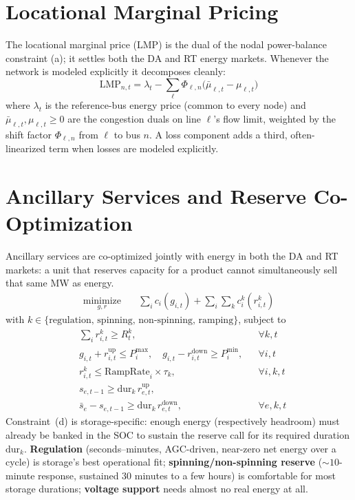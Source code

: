 \documentclass[10pt,conference]{IEEEtran}
\newcommand{\minimize}{\operatorname*{minimize}}
\begin{document}
\section{Locational Marginal Pricing}
The locational marginal price (LMP) is the dual of the nodal power-balance constraint
(a); it settles both the DA and RT energy markets. Whenever the network is modeled
explicitly it decomposes cleanly:
\begin{equation}
\mathrm{LMP}_{n,t} = \lambda_t - \sum_{\ell} \Phi_{\ell,n}\big(\bar\mu_{\ell,t}-\mu_{\ell,t}\big)
\label{eq:lmp}
\end{equation}
where $\lambda_t$ is the reference-bus energy price (common to every node) and
$\bar\mu_{\ell,t},\mu_{\ell,t}\ge 0$ are the congestion duals on line $\ell$'s flow limit,
weighted by the shift factor $\Phi_{\ell,n}$ from $\ell$ to bus $n$. A loss component adds
a third, often-linearized term when losses are modeled explicitly.

\section{Ancillary Services and Reserve Co-Optimization}
\label{sec:as}
Ancillary services are co-optimized jointly with energy in both the DA and RT markets: a
unit that reserves capacity for a product cannot simultaneously sell that same MW as
energy.
\begin{align}
\minimize_{g,r} \quad & \sum_i c_i(g_{i,t}) + \sum_i\sum_k c_i^k(r_{i,t}^k)
\end{align}
with $k \in \{\text{regulation, spinning, non-spinning, ramping}\}$, subject to
\begin{align*}
&\textstyle\sum_i r_{i,t}^k \ge R_t^k, && \forall k,t \tag{a}\\
&g_{i,t}+r_{i,t}^{\text{up}} \le P_i^{\max},\quad g_{i,t}-r_{i,t}^{\text{down}} \ge P_i^{\min}, && \forall i,t \tag{b}\\
&r_{i,t}^k \le \mathrm{RampRate}_i \times \tau_k, && \forall i,k,t \tag{c}\\
&s_{e,t-1} \ge \mathrm{dur}_k\, r_{e,t}^{\text{up}}, \label{eq:soc-reserve}\\
&\bar s_e - s_{e,t-1} \ge \mathrm{dur}_k\, r_{e,t}^{\text{down}}, && \forall e,k,t \tag{d}
\end{align*}
Constraint~(d) is storage-specific: enough energy (respectively headroom) must already
be banked in the SOC to sustain the reserve call for its required duration
$\mathrm{dur}_k$. \textbf{Regulation} (seconds--minutes, AGC-driven, near-zero net energy
over a cycle) is storage's best operational fit; \textbf{spinning/non-spinning reserve}
($\sim\!10$-minute response, sustained 30 minutes to a few hours) is comfortable for most
storage durations; \textbf{voltage support} needs almost no real energy at all.
\end{document}
